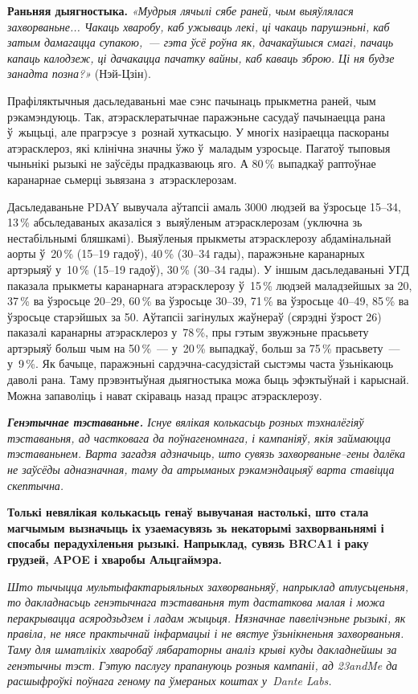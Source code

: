 \textbf{Раньняя дыягностыка.} \emph{«Мудрыя лячылі сябе раней, чым выяўлялася захворваньне... Чакаць хваробу, каб ужываць лекі, ці чакаць парушэньні, каб затым дамагацца супакою,~--- гэта ўсё роўна як, дачакаўшыся смагі, пачаць капаць калодзеж, ці дачакацца пачатку вайны, каб каваць зброю. Ці ня будзе занадта позна?»} (Нэй-Цзін).

Прафіляктычныя дасьледаваньні мае сэнс пачынаць прыкметна раней, чым рэкамэндуюць. Так, атэрасклератычнае паражэньне сасудаў пачынаецца рана ў~жыцьці, але прагрэсуе з~рознай хуткасьцю. У многіх назіраецца паскораны атэрасклероз, які клінічна значны ўжо ў~маладым узросьце. Пагатоў тыповыя чыньнікі рызыкі не заўсёды прадказваюць яго. А 80\,\% выпадкаў раптоўнае каранарнае сьмерці зьвязана з~атэрасклерозам.

Дасьледаваньне PDAY вывучала аўтапсіі амаль 3000 людзей ва ўзросьце 15--34, 13\,\% абсьледаваных аказаліся з~выяўленым атэрасклерозам (уключна зь нестабільнымі бляшкамі). Выяўленыя прыкметы атэрасклерозу абдамінальнай аорты ў~20\,\% (15--19 гадоў), 40\,\% (30--34 гады), паражэньне каранарных артэрыяў у~10\,\% (15--19 гадоў), 30\,\% (30--34 гады). У іншым дасьледаваньні УГД паказала прыкметы каранарнага атэрасклерозу ў~15\,\% людзей маладзейшых за 20, 37\,\% ва ўзросьце 20--29, 60\,\% ва ўзросьце 30--39, 71\,\% ва ўзросьце 40--49, 85\,\% ва ўзросьце старэйшых за 50. Аўтапсіі загінулых жаўнераў (сярэдні ўзрост 26) паказалі каранарны атэрасклероз у~78\,\%, пры гэтым звужэньне прасьвету артэрыяў больш чым на 50\,\%~--- у~20\,\% выпадкаў, больш за 75\,\% прасьвету~--- у~9\,\%. Як бачыце, паражэньні сардэчна-сасудзістай сыстэмы часта ўзьнікаюць даволі рана. Таму прэвэнтыўная дыягностыка можа быць эфэктыўнай і карыснай. Можна запаволіць і нават скіраваць назад працэс атэрасклерозу.

\emph{\textbf{Генэтычнае тэставаньне.} Існуе вялікая колькасьць розных тэхналёгіяў тэставаньня, ад частковага да поўнагеномнага, і кампаніяў, якія займаюцца тэставаньнем. Варта загадзя адзначыць, што сувязь захворваньне--гены далёка не заўсёды адназначная, таму да атрыманых рэкамэндацыяў варта ставіцца скептычна.}

\textbf{Толькі невялікая колькасьць генаў вывучаная настолькі, што стала магчымым вызначыць іх узаемасувязь зь некаторымі захворваньнямі і спосабы перадухіленьня рызыкі. Напрыклад, сувязь BRCA1 і раку грудзей, APOE і хваробы Альцгаймэра.}

\emph{Што тычыцца мультыфактарыяльных захворваньняў, напрыклад атлусьценьня, то дакладнасьць генэтычнага тэставаньня тут дастаткова малая і можа перакрывацца асяродзьдзем і ладам жыцьця. Нязначнае павелічэньне рызыкі, як правіла, не нясе практычнай інфармацыі і не вястуе ўзьнікненьня захворваньня. Таму для шматлікіх хваробаў лябараторны аналіз крыві куды дакладнейшы за генэтычны тэст. Гэтую паслугу прапануюць розныя кампаніі, ад 23andMe да расшыфроўкі поўнага геному па ўмераных коштах у~Dante Labs.}

